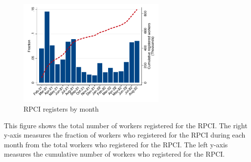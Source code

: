 \documentclass[oneside,11pt]{article}
\begin{document}
\begin{figure}[H]
    \caption{RPCI registers by month}
    \label{hist_download}
    \begin{center}
    \includegraphics[width=0.65\textwidth]{04_Figures/muestra_1porciento/hist_download_month.pdf}
    \end{center}
\end{figure}
\scriptsize{
\noindent This figure shows the total number of workers registered for the RPCI. The right y-axis measures the fraction of workers who registered for the RPCI during each month from the total workers who registered for the RPCI. The left y-axis measures the cumulative number of workers who registered for the RPCI.
}

\clearpage

\end{document}
